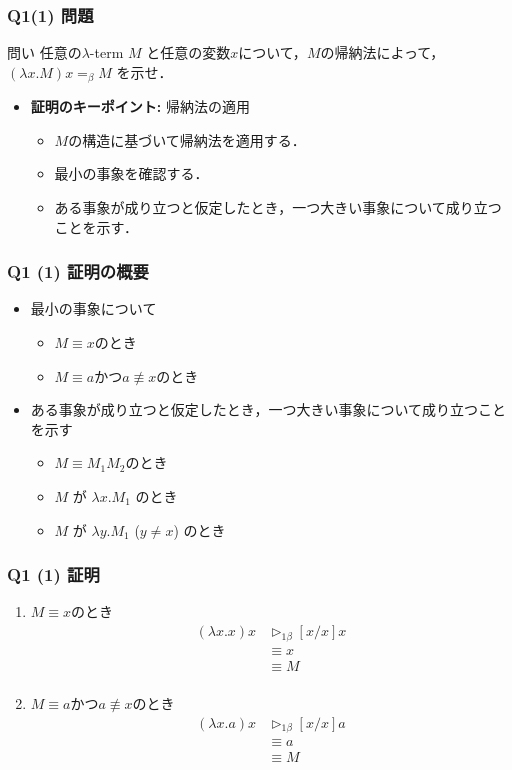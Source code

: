 \begin{frame}[fragile]\frametitle{Q1(1) 問題}
  \begin{alertblock}{問い}
    任意の$\lambda$-term $M$ と任意の変数$x$について，$M$の帰納法によって，
    $(\lambda x.M)x =_{\beta} M$ を示せ．
  \end{alertblock}
  \begin{itemize}
    \item \textbf{証明のキーポイント:} \alert{帰納法の適用}
    \begin{itemize}
        \item $M$の構造に基づいて帰納法を適用する．
        \item 最小の事象を確認する．
        \item ある事象が成り立つと仮定したとき，一つ大きい事象について成り立つことを示す．
    \end{itemize}
\end{itemize}
\end{frame}

\begin{frame}
\frametitle{Q1 (1) 証明の概要}
\begin{itemize}
    \item 最小の事象について
    \begin{itemize}
        \item $M \equiv x$のとき
        \item $M \equiv a$かつ$a \not\equiv x$のとき
    \end{itemize}
    \item ある事象が成り立つと仮定したとき，一つ大きい事象について成り立つことを示す
    \begin{itemize}
        \item $M \equiv M_1 M_2$のとき
        \item $M$ が $\lambda x. M_1$ のとき
        \item $M$ が $\lambda y. M_1$ ($y \neq x$) のとき
    \end{itemize}
\end{itemize}
\end{frame}

\begin{frame}
\frametitle{Q1 (1) 証明}
\begin{enumerate}
    \item $M \equiv x$のとき
    \begin{align*}
    (\lambda x.x)x &\rhd_{1\beta} [x/x]x \\
    &\equiv x \\
    &\equiv M \\
    \end{align*}

    \item $M \equiv a$かつ$a \not\equiv x$のとき
    \begin{align*}
    (\lambda x.a)x &\rhd_{1\beta} [x/x]a \\
    &\equiv a \\
    &\equiv M \\
    \end{align*}
\end{enumerate}
\end{frame}

